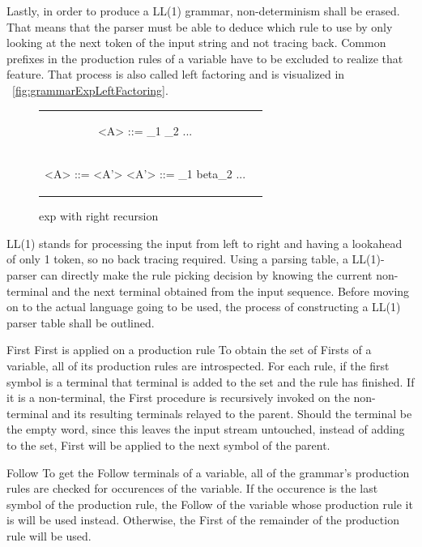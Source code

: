 Lastly, in order to produce a LL(1) grammar, non-determinism shall be erased. That means that the parser must be able to deduce which rule to use by only looking at the next token of the input string and not tracing back. Common prefixes in the production rules of a variable have to be excluded to realize that feature. That process is also called left factoring and is visualized in ~\ref{fig:grammarExpLeftFactoring}.

\begin{figure}
	\label{grammarExpRR}
	\caption{exp with right recursion}

	\begin{center}
		\begin{tabular}{c c}
			\begin{grammar}
				<A> ::= \alpha \beta_1
				\alt \alpha \beta_2
				...
			\end{grammar}
			\\
			\begin{grammar}
				<A> ::= \alpha <A'>
				<A'> ::= \beta_1
				\alt beta_2
				...
			\end{grammar}
		\end{tabular}
	\end{center}
\end{figure}

LL(1) stands for processing the input from left to right and having a lookahead of only 1 token, so no back tracing required. Using a parsing table, a LL(1)-parser can directly make the rule picking decision by knowing the current non-terminal and the next terminal obtained from the input sequence. Before moving on to the actual language going to be used, the process of constructing a LL(1) parser table shall be outlined.

First
First is applied on a production rule
To obtain the set of Firsts of a variable, all of its production rules are introspected. For each rule, if the first symbol is a terminal that terminal is added to the set and the rule has finished. If it is a non-terminal, the First procedure is recursively invoked on the non-terminal and its resulting terminals relayed to the parent. Should the terminal be the empty word, since this leaves the input stream untouched, instead of adding \epsilon to the set, First will be applied to the next symbol of the parent.

Follow
To get the Follow terminals of a variable, all of the grammar's production rules are checked for occurences of the variable. If the occurence is the last symbol of the production rule, the Follow of the variable whose production rule it is will be used instead. Otherwise, the First of the remainder of the production rule will be used.

